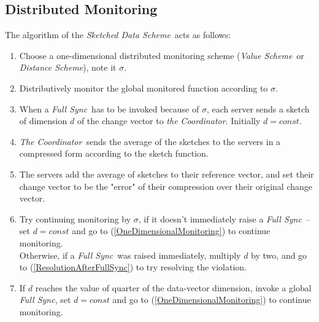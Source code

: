 \documentclass[10pt, conference]{IEEEtran}
\newcommand{\valueScheme}{\textit{Value Scheme}}
\newcommand{\distanceScheme}{\textit{Distance Scheme}}
\newcommand{\sketchScheme}{\textit{Sketched Data Scheme}}
\newcommand{\fullSync}{\textit{Full Sync}}
\newcommand{\theCoordinator}{\textit{the Coordinator}}
\newcommand{\TheCoordinator}{\textit{The Coordinator}}
\begin{document}
\subsection{Distributed Monitoring}
The algorithm of the \sketchScheme \ acts as follows:
\begin{enumerate}
\item Choose a one-dimensional distributed monitoring scheme (\valueScheme \ or \distanceScheme ), note it $\sigma$.
\item \label{OneDimensionalMonitoring} Distributively monitor the global monitored function according to $\sigma$.
\item \label{ResolutionAfterFullSync} When a \fullSync \ has to be invoked because of $\sigma$, each server sends a sketch of dimension $d$ of the change vector to \theCoordinator . Initially $d = const$.
\item \TheCoordinator \ sends the average of the sketches to the servers in a compressed form according to the sketch function.
\item The servers add the average of sketches to their reference vector, and set their change vector to be the "error" of their compression over their original change vector.
\item Try continuing monitoring by $\sigma$, if it doesn't immediately raise a \fullSync \ -- set ${d = const}$ and go to (\ref{OneDimensionalMonitoring}) to continue monitoring. \\
Otherwise, if a \fullSync \ was raised immediately, multiply $d$ by two, and go to (\ref{ResolutionAfterFullSync}) to try resolving the violation.
\item If $d$ reaches the value of quarter of the data-vector dimension, invoke a global \fullSync , set $d = const$ and go to (\ref{OneDimensionalMonitoring}) to continue monitoring.
\end{enumerate}
\end{document}
